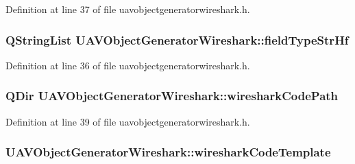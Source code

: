 Definition at line 37 of file uavobjectgeneratorwireshark.\-h.

\hypertarget{class_u_a_v_object_generator_wireshark_a7a2a353b4a9b437973989572c9b8751f}{
\subsubsection[{field\-Type\-Str\-Hf}]{\setlength{\rightskip}{0pt plus 5cm}Q\-String\-List U\-A\-V\-Object\-Generator\-Wireshark\-::field\-Type\-Str\-Hf}}\label{class_u_a_v_object_generator_wireshark_a7a2a353b4a9b437973989572c9b8751f}


Definition at line 36 of file uavobjectgeneratorwireshark.\-h.

\hypertarget{class_u_a_v_object_generator_wireshark_a8a63f8ee4cd416f6690b936e28062ab8}{
\subsubsection[{wireshark\-Code\-Path}]{\setlength{\rightskip}{0pt plus 5cm}Q\-Dir U\-A\-V\-Object\-Generator\-Wireshark\-::wireshark\-Code\-Path}}\label{class_u_a_v_object_generator_wireshark_a8a63f8ee4cd416f6690b936e28062ab8}


Definition at line 39 of file uavobjectgeneratorwireshark.\-h.

\hypertarget{class_u_a_v_object_generator_wireshark_aacc4df17c111504607837b77a78a87f6}{
\subsubsection[{wireshark\-Code\-Template}]{ U\-A\-V\-Object\-Generator\-Wireshark\-::wireshark\-Code\-Template}}\label{class_u_a_v_object_generator_wireshark_aacc4df17c111504607837b77a78a87f6}


